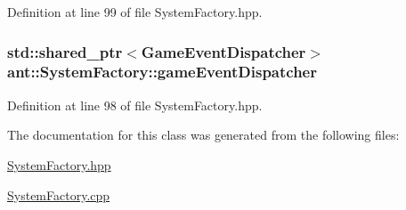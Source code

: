 Definition at line 99 of file System\+Factory.\+hpp.

\hypertarget{classant_1_1_system_factory_ac2e43c03f569c09b2ab6a3539e0fc42a}{
\subsubsection[{game\+Event\+Dispatcher}]{\setlength{\rightskip}{0pt plus 5cm}std\+::shared\+\_\+ptr$<${\bf Game\+Event\+Dispatcher}$>$ ant\+::\+System\+Factory\+::game\+Event\+Dispatcher\hspace{0.3cm}{\ttfamily [private]}}}\label{classant_1_1_system_factory_ac2e43c03f569c09b2ab6a3539e0fc42a}


Definition at line 98 of file System\+Factory.\+hpp.



The documentation for this class was generated from the following files\+:\begin{DoxyCompactItemize}
\item 
\hyperlink{_system_factory_8hpp}{System\+Factory.\+hpp}\item 
\hyperlink{_system_factory_8cpp}{System\+Factory.\+cpp}\end{DoxyCompactItemize}

